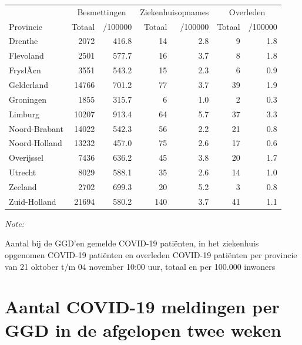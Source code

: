 \documentclass[
  english,
  man,floatsintext]{apa6}
\begin{document}
\begin{table}
\centering
\begin{threeparttable}
\begin{tabular}{lrrrrrr}
\toprule
\multicolumn{1}{c}{ } & \multicolumn{2}{c}{Besmettingen} & \multicolumn{2}{c}{Ziekenhuisopnames} & \multicolumn{2}{c}{Overleden} \\
\cmidrule(l{3pt}r{3pt}){2-3} \cmidrule(l{3pt}r{3pt}){4-5} \cmidrule(l{3pt}r{3pt}){6-7}
Provincie & Totaal & /100000 & Totaal & /100000 & Totaal & /100000\\
\midrule
Drenthe & 2072 & 416.8 & 14 & 2.8 & 9 & 1.8\\
Flevoland & 2501 & 577.7 & 16 & 3.7 & 8 & 1.8\\
FryslÃ¢n & 3551 & 543.2 & 15 & 2.3 & 6 & 0.9\\
Gelderland & 14766 & 701.2 & 77 & 3.7 & 39 & 1.9\\
Groningen & 1855 & 315.7 & 6 & 1.0 & 2 & 0.3\\
Limburg & 10207 & 913.4 & 64 & 5.7 & 37 & 3.3\\
Noord-Brabant & 14022 & 542.3 & 56 & 2.2 & 21 & 0.8\\
Noord-Holland & 13232 & 457.0 & 75 & 2.6 & 17 & 0.6\\
Overijssel & 7436 & 636.2 & 45 & 3.8 & 20 & 1.7\\
Utrecht & 8029 & 588.1 & 35 & 2.6 & 14 & 1.0\\
Zeeland & 2702 & 699.3 & 20 & 5.2 & 3 & 0.8\\
Zuid-Holland & 21694 & 580.2 & 140 & 3.7 & 41 & 1.1\\
\bottomrule
\end{tabular}
\begin{tablenotes}
\item \textit{Note: } 
\item Aantal bij de GGD’en gemelde COVID-19 patiënten, in het ziekenhuis opgenomen COVID-19 patiënten en overleden COVID-19 patiënten per provincie van 21 oktober t/m 04 november 10:00 uur, totaal en per 100.000 inwoners
\end{tablenotes}
\end{threeparttable}
\end{table}

\newpage

\hypertarget{aantal-covid-19-meldingen-per-ggd-in-de-afgelopen-twee-weken}{%
\section{Aantal COVID-19 meldingen per GGD in de afgelopen twee weken}\label{aantal-covid-19-meldingen-per-ggd-in-de-afgelopen-twee-weken}}
\end{document}
